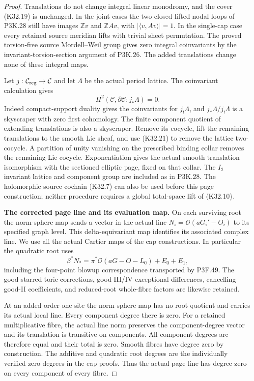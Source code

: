 \begin{proof}
Translations do not change integral linear monodromy,
and the cover (K32.19) is unchanged. In the joint
cases the two closed lifted nodal loops of P3K.28
still have images $\mathbb Zv$ and $\mathbb ZAv$,
with $|\langle v,Av\rangle|=1$. In the single-cap
case every retained source meridian lifts with
trivial sheet permutation. The proved torsion-free
source Mordell--Weil group gives zero integral
coinvariants by the invariant-torsion-section
argument of P3K.26. The added translations change
none of these integral maps.

Let $j:\mathcal C_{\rm reg}\to\mathcal C$ and let
$\Lambda$ be the actual period lattice. The
coinvariant calculation gives
\[
       H^2(\mathcal C,\partial\mathcal C;j_*\Lambda)=0.
                                                               \tag{K32.21}
\]
Indeed compact-support duality gives the coinvariants
for $j_!\Lambda$, and $j_*\Lambda/j_!\Lambda$ is a
skyscraper with zero first cohomology. The finite
component quotient of extending translations is
also a skyscraper. Remove its cocycle, lift the
remaining translations to the smooth Lie sheaf,
and use (K32.21) to remove the lattice two-cocycle.
A partition of unity vanishing on the prescribed
binding collar removes the remaining Lie cocycle.
Exponentiation gives the actual smooth translation
isomorphism with the sectioned elliptic page, fixed
on that collar. The $I_2$ invariant lattice and
component group are included as in P3K.28.
The holomorphic source cochain (K32.7) can also be
used before this page construction; neither procedure
requires a global total-space lift of (K32.10).

\par\medskip\noindent\textbf{The corrected page line and its evaluation map.}
On each surviving root the norm-sphere map sends a
vector in the actual line
$N_i=\mathcal O(aG_i'-O_i)$ to its specified graph
level. This delta-equivariant map identifies its
associated complex line. We use all the actual
Cartier maps of the cap constructions. In particular
the quadratic root uses
\[
 \beta^*N_*
  =\pi^*\mathcal O(aG-O-L_0)+E_0+E_1,                 \tag{K32.22}
\]
including the four-point blowup correspondence
transported by P3F.49. The good-starred toric
corrections, good III/IV exceptional differences,
cancelling good-II coefficients, and reduced-root
whole-fibre factors are likewise retained.

At an added order-one site the norm-sphere map has
no root quotient and carries its actual local line.
Every component degree there is zero. For a retained
multiplicative fibre, the actual line norm preserves
the component-degree vector and its translation is
transitive on components. All component degrees are
therefore equal and their total is zero. Smooth
fibres have degree zero by construction. The
additive and quadratic root degrees are the
individually verified zero degrees in the cap proofs.
Thus the actual page line has degree zero on every
component of every fibre.


\end{proof}
